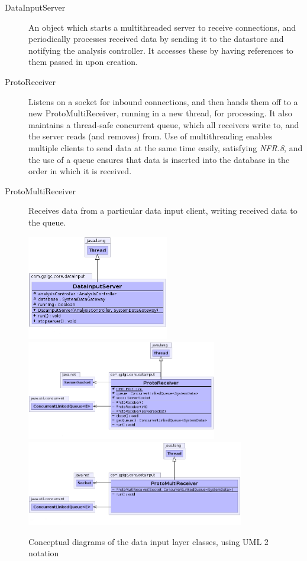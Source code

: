 \documentclass[10pt,a4paper]{article}
\newcommand{\nfrit}[1]{\textit{NFR.#1}}
\begin{document}
\begin{description}
  \item[DataInputServer] An object which starts a multithreaded
    server to receive connections, and periodically processes
    received data by sending it to the datastore and notifying the
    analysis controller. It accesses these by having references to them
    passed in upon creation.

  \item[ProtoReceiver] Listens on a socket for inbound connections,
    and then hands them off to a new ProtoMultiReceiver, running in a
    new thread, for processing. It also maintains a thread-safe
    concurrent queue, which all receivers write to, and the
    server reads (and removes) from. Use of multithreading
    enables multiple clients to send data at the same time easily, satisfying \nfrit{8}, and
    the use of a queue ensures that data is inserted into the database
    in the order in which it is received.

  \item[ProtoMultiReceiver] Receives data from a particular data input
    client, writing received data to the queue.
\end{description}

\begin{figure}[ht!]
  \centering
  \includegraphics[width=6.2cm]{images/DataInputLayer/DataInputServer.png}
  \includegraphics[width=8.3cm]{images/DataInputLayer/ProtoReceiver.png}
  \includegraphics[width=9.5cm]{images/DataInputLayer/ProtoMultiReceiver.png}
  \caption{Conceptual diagrams of the data input layer classes, using 
UML 2 notation}
  \label{fig:dataInputLayer}
\end{figure}
\end{document}

